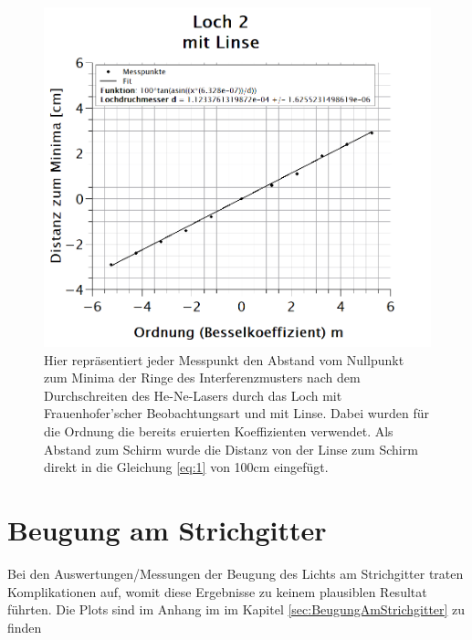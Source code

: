 \begin{figure}[h]
\centering
\includegraphics[width=\textwidth]{Bilder/loch2_mitLinse.png}  
\caption[Loch 2: mit Linse]{Hier repräsentiert jeder Messpunkt den Abstand vom Nullpunkt zum Minima der Ringe des Interferenzmusters nach dem Durchschreiten des He-Ne-Lasers durch das Loch mit Frauenhofer'scher Beobachtungsart und mit Linse. Dabei wurden für die Ordnung die bereits eruierten Koeffizienten verwendet. Als Abstand zum Schirm wurde die Distanz von der Linse zum Schirm direkt in die Gleichung \ref{eq:1} von 100cm eingefügt.}
\label{fig:loch2_mitLinse}
\end{figure}

\section{Beugung am Strichgitter}
Bei den Auswertungen/Messungen der Beugung des Lichts am Strichgitter traten Komplikationen auf, womit diese Ergebnisse zu keinem plausiblen Resultat führten. Die Plots sind im Anhang im im Kapitel \ref{sec:BeugungAmStrichgitter} \textit{} zu finden
\newpage